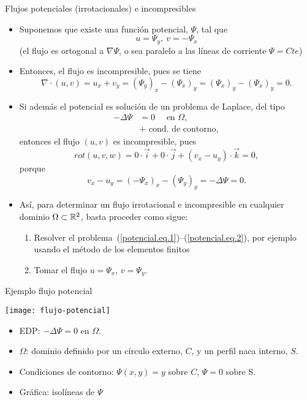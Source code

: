 \documentclass[9pt, dvipsnames,]{beamer}
\begin{document}
\begin{frame}{Flujos potenciales (irrotacionales) e incompresibles}
\begin{itemize}
\item Suponemos que existe una función potencial, $\Psi$, tal que
  $$u=\Psi_y, \ v=-\Psi_x$$
    \hfill{\scriptsize (el flujo es ortogonal a $\nabla\Psi$, o sea paralelo a las líneas de corriente $\Psi=Cte$)}
  \item Entonces, el flujo es \alert{incompresible}, pues se tiene
  $$
  \nabla\cdot(u,v) = u_x + v_y = (\Psi_{y})_x - (\Psi_{x})_y = (\Psi_{x})_y - (\Psi_{x})_y   =  0.
  $$
\item Si además el potencial es solución de un problema de Laplace, del tipo
  \begin{align}
    \label{potencial.eq.1}
    -\Delta \Psi &= 0 \quad \text{ en } \Omega, \\
    \label{potencial.eq.2}
    &+ \text{ cond. de contorno},
  \end{align}
  entonces el flujo $(u,v)$ es \alert{incompresible}, pues
  $$
  rot(u,v,w) = 0\cdot \vec{i} + 0\cdot \vec j + (v_x - u_y)\cdot \vec k = 0,
  $$
  porque
  $$
  v_x - u_y = (-\Psi_{x})_x - (\Psi_{y})_y = -\Delta\Psi = 0.
  $$
\item Así, para determinar un flujo irrotacional e incompresible en
  cualquier dominio $\Omega\subset{\mathbb R}^2$, basta proceder como sigue:
  \begin{enumerate}
  \item Resolver el
    problema~(\ref{potencial.eq.1})--(\ref{potencial.eq.2}), por
    ejemplo usando el método de los elementos finitos
  \item Tomar el flujo $u=\Psi_x$, $v=\Psi_y$.
  \end{enumerate}

\end{itemize}

\end{frame}

\begin{frame}{Ejemplo flujo potencial}
  \begin{center}
    \texttt{[image: flujo-potencial]}
  \end{center}
  \begin{itemize}
    \item EDP: $-\Delta\Psi = 0$ en $\Omega$.
    \item $\Omega$: dominio definido por un círculo externo, $C$, y un perfil naca interno, $S$.
    \item Condiciones de contorno: $\Psi(x,y)=y$ sobre $C$, $\Psi=0$ sobre S.
    \item Gráfica: isolíneas de  $\Psi$
  \end{itemize}
\end{frame}
\end{document}
